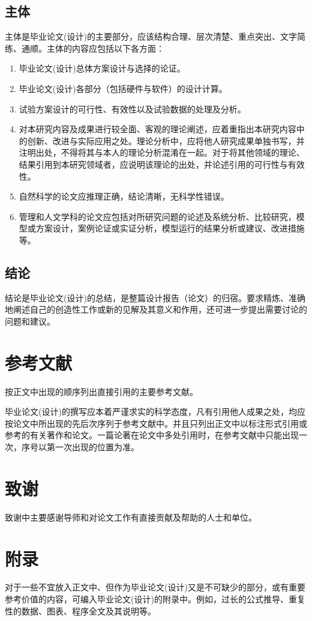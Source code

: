 \subsection{主体}
主体是毕业论文(设计)的主要部分，应该结构合理、层次清楚、重点突出、文字简练、通顺。主体的内容应包括以下各方面：
\begin{enumerate}
	\item 毕业论文(设计)总体方案设计与选择的论证。	
	\item 毕业论文(设计)各部分（包括硬件与软件）的设计计算。
	\item 试验方案设计的可行性、有效性以及试验数据的处理及分析。
	\item 对本研究内容及成果进行较全面、客观的理论阐述，应着重指出本研究内容中的创新、改进与实际应用之处。理论分析中，应将他人研究成果单独书写，并注明出处，不得将其与本人的理论分析混淆在一起。对于将其他领域的理论、结果引用到本研究领域者，应说明该理论的出处，并论述引用的可行性与有效性。
	\item 自然科学的论文应推理正确，结论清晰，无科学性错误。
	\item 管理和人文学科的论文应包括对所研究问题的论述及系统分析、比较研究，模型或方案设计，案例论证或实证分析，模型运行的结果分析或建议、改进措施等。
\end{enumerate}

\subsection{结论}
结论是毕业论文(设计)的总结，是整篇设计报告（论文）的归宿。要求精炼、准确地阐述自己的创造性工作或新的见解及其意义和作用，还可进一步提出需要讨论的问题和建议。

\section{参考文献}
按正文中出现的顺序列出直接引用的主要参考文献。

毕业论文(设计)的撰写应本着严谨求实的科学态度，凡有引用他人成果之处，均应按论文中所出现的先后次序列于参考文献中。并且只列出正文中以标注形式引用或参考的有关著作和论文。一篇论著在论文中多处引用时，在参考文献中只能出现一次，序号以第一次出现的位置为准。

\section{致谢}
致谢中主要感谢导师和对论文工作有直接贡献及帮助的人士和单位。

\section{附录}
对于一些不宜放入正文中、但作为毕业论文(设计)又是不可缺少的部分，或有重要参考价值的内容，可编入毕业论文(设计)的附录中。例如，过长的公式推导、重复性的数据、图表、程序全文及其说明等。